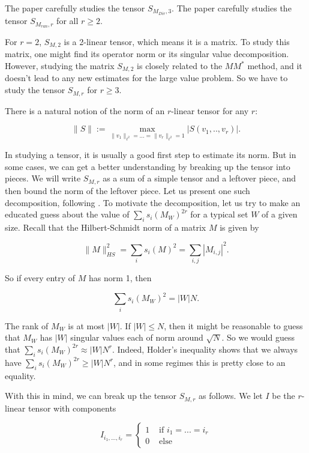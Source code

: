 \documentclass{amsart}
\begin{document}
The paper \cite{GM} carefully studies the tensor $S_{M_{Dir}, 3}$.  The paper \cite{DHPT} carefully studies the tensor $S_{M_{ran}, r}$ for all $r \ge 2$. 

For $r=2$, $S_{M, 2}$ is a 2-linear tensor, which means it is a matrix.  To study this matrix, one might find its operator norm or its singular value decomposition.  However, studying the matrix $S_{M, 2}$ is closely related to the $M M^*$ method, and it doesn't lead to any new estimates for the large value problem.  So we have to study the tensor $S_{M, r}$ for $r \ge 3$.

There is a natural notion of the norm of an $r$-linear tensor for any $r$:

\begin{equation} \label{defnormtensor} \| S \| := \max_{\| v_1 \|_{\ell^2} = ... = \| v_r \|_{\ell^2} = 1} | S(v_1, .., v_r) |. \end{equation}

In studying a tensor, it is usually a good first step to estimate its norm.   But in some cases, we can get a better understanding by breaking up the tensor into pieces.  We will write $S_{M,r}$ as a sum of a simple tensor and a leftover piece, and then bound the norm of the leftover piece.   Let us present one such decomposition, following \cite{GM}.  To motivate the decomposition, let us try to make an educated guess about the value of $\sum_i s_i(M_W)^{2r}$ for a typical set $W$ of a given size.  Recall that the Hilbert-Schmidt norm of a matrix $M$ is given by

$$ \| M \|_{HS}^2 = \sum_i s_i(M)^2 = \sum_{i,j} |M_{i,j}|^2. $$

\noindent So if every entry of $M$ has norm 1, then

$$ \sum_i s_i(M_W)^2 = |W| N. $$

\noindent The rank of $M_W$ is at most $|W|$.  If $|W| \le N$, then it might be reasonable to guess that $M_W$ has $|W|$ singular values each of norm around $\sqrt{N}$.  So we would guess that $\sum_i s_i(M_W)^{2r} \approx |W| N^r$.  Indeed, Holder's inequality shows that we always have $\sum_i s_i(M_W)^{2r} \ge |W| N^r$, and in some regimes this is pretty close to an equality.

With this in mind, we can break up the tensor $S_{M,r}$ as follows.  We let $I$ be the $r$-linear tensor with components 

$$ I_{i_1, ..., i_r} = \begin{cases} 1 & \textrm{ if } i_1 = ... = i_r \\ 0 & \textrm{ else }
\end{cases} $$
\end{document}
